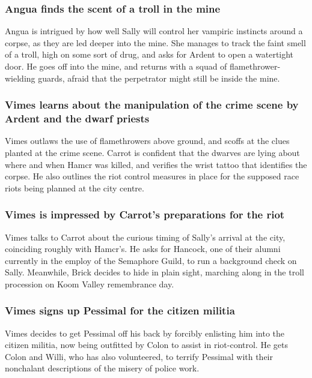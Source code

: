 \subsubsection{\Gls{Angua} finds the scent of a troll in the mine}
\Gls{Angua} is intrigued by how well \Gls{Sally} will control her vampiric instincts around a
corpse, as they are led deeper into the mine. She manages to track the faint smell of a troll, high
on some sort of drug, and asks for \Gls{Ardent} to open a watertight door. He goes off into the
mine, and returns with a squad of flamethrower-wielding guards, afraid that the perpetrator might
still be inside the mine.

\subsubsection{\Gls{Vimes} learns about the manipulation of the crime scene by \Gls{Ardent} and the
    dwarf priests}
\Gls{Vimes} outlaws the use of flamethrowers above ground, and scoffs at the clues planted at the
crime scene. \Gls{Carrot} is confident that the dwarves are lying about where and when \Gls{Hamcr}
was killed, and verifies the wrist tattoo that identifies the corpse. He also outlines the riot
control measures in place for the supposed race riots being planned at the city centre.

\subsubsection{\Gls{Vimes} is impressed by \Gls{Carrot}'s preparations for the riot}
\Gls{Vimes} talks to \Gls{Carrot} about the curious timing of \Gls{Sally}'s arrival at the city,
coinciding roughly with \Gls{Hamcr}'s. He asks for \Gls{Hancock}, one of their alumni currently in
the employ of the Semaphore Guild, to run a background check on \Gls{Sally}. Meanwhile, \Gls{Brick}
decides to hide in plain sight, marching along in the troll procession on Koom Valley remembrance
day.

\subsubsection{\Gls{Vimes} signs up \Gls{Pessimal} for the citizen militia}
\Gls{Vimes} decides to get \Gls{Pessimal} off his back by forcibly enlisting him into the citizen
militia, now being outfitted by \Gls{Colon} to assist in riot-control. He gets \Gls{Colon} and
\Gls{Willi}, who has also volunteered, to terrify \Gls{Pessimal} with their nonchalant descriptions
of the misery of police work.

